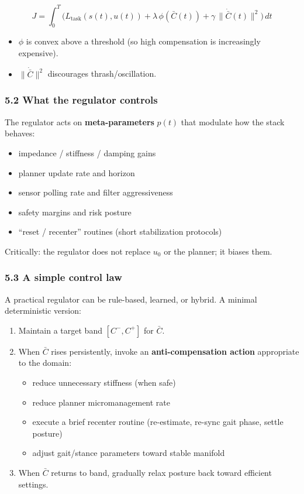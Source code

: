 \documentclass[11pt]{article}
\providecommand{\tightlist}{%
  \setlength{\itemsep}{0pt}\setlength{\parskip}{0pt}}
\begin{document}
\[
J = \int_0^T \Big( L_{\text{task}}(s(t),u(t))
+ \lambda\,\phi(\bar C(t))
+ \gamma\,\|\dot{\bar C}(t)\|^2 \Big)\,dt
\]

\begin{itemize}
\tightlist
\item
  \(\phi\) is convex above a threshold (so high compensation is increasingly expensive).
\item
  \(\|\dot{\bar C}\|^2\) discourages thrash/oscillation.
\end{itemize}

\hypertarget{what-the-regulator-controls}{%
\subsubsection{5.2 What the regulator controls}\label{what-the-regulator-controls}}

The regulator acts on \textbf{meta-parameters} \(p(t)\) that modulate how the stack behaves:

\begin{itemize}
\tightlist
\item
  impedance / stiffness / damping gains
\item
  planner update rate and horizon
\item
  sensor polling rate and filter aggressiveness
\item
  safety margins and risk posture
\item
  ``reset / recenter'' routines (short stabilization protocols)
\end{itemize}

Critically: the regulator does not replace \(u_0\) or the planner; it biases them.

\hypertarget{a-simple-control-law}{%
\subsubsection{5.3 A simple control law}\label{a-simple-control-law}}

A practical regulator can be rule-based, learned, or hybrid. A minimal deterministic version:

\begin{enumerate}
\def\labelenumi{\arabic{enumi}.}
\tightlist
\item
  Maintain a target band \([C^-, C^+]\) for \(\bar C\).
\item
  When \(\bar C\) rises persistently, invoke an \textbf{anti-compensation action} appropriate to the domain:

  \begin{itemize}
  \tightlist
  \item
    reduce unnecessary stiffness (when safe)
  \item
    reduce planner micromanagement rate
  \item
    execute a brief recenter routine (re-estimate, re-sync gait phase, settle posture)
  \item
    adjust gait/stance parameters toward stable manifold
  \end{itemize}
\item
  When \(\bar C\) returns to band, gradually relax posture back toward efficient settings.
\end{enumerate}
\end{document}
